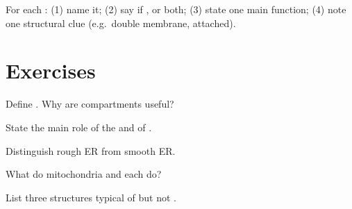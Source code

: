\begin{method}\label{met:g8:organelles:card}
For each : (1) name it; (2) say if ,  or both;
(3) state one main function; (4) note one structural clue (e.g.\ double
membrane,  attached).
\end{method}

\section{Exercises}

\begin{exercise}[$\star$]\label{exo:g8:organelles:1}
Define . Why are compartments useful?
\end{exercise}

\begin{exercise}[$\star$]\label{exo:g8:organelles:2}
State the main role of the  and of .
\end{exercise}

\begin{exercise}[$\star$]\label{exo:g8:organelles:3}
Distinguish rough ER from smooth ER.
\end{exercise}

\begin{exercise}[$\star$]\label{exo:g8:organelles:4}
What do mitochondria and  each do?
\end{exercise}

\begin{exercise}[$\star$]\label{exo:g8:organelles:5}
List three structures typical of   but not  .
\end{exercise}

